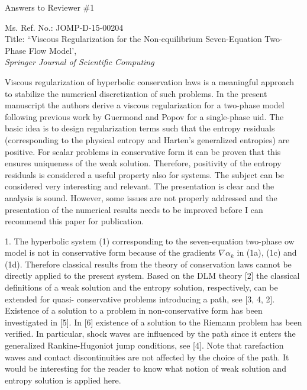 \documentclass{article}
\begin{document}

\begin{center}
{ \Large Answers to Reviewer \#1}
\end{center}

\bigskip

\noindent Ms. Ref. No.: JOMP-D-15-00204\\
Title: ``Viscous Regularization for the Non-equilibrium Seven-Equation Two-Phase Flow Model', \\
{\it Springer Journal of Scientific Computing}\\

\bigskip
\bigskip

{\color{blue}
Viscous regularization of hyperbolic conservation laws is a meaningful approach to stabilize
the numerical discretization of such problems. In the present manuscript the authors derive
a viscous regularization for a two-phase model following previous work by Guermond and
Popov for a single-phase 
uid. The basic idea is to design regularization terms such that
the entropy residuals (corresponding to the physical entropy and Harten's generalized
entropies) are positive. For scalar problems in conservative form it can be proven that this
ensures uniqueness of the weak solution. Therefore, positivity of the entropy residuals is
considered a useful property also for systems.
The subject can be considered very interesting and relevant. The presentation is clear
and the analysis is sound. However, some issues are not properly addressed and the
presentation of the numerical results needs to be improved before I can recommend this
paper for publication.}

\bigskip


{\color{blue}
1. The hyperbolic system (1) corresponding to the seven-equation two-phase ow model
is not in conservative form because of the gradients $\nabla \alpha_k$ in (1a), (1c) and (1d).
Therefore classical results from the theory of conservation laws cannot be directly
applied to the present system. Based on the DLM theory [2] the classical definitions
of a weak solution and the entropy solution, respectively, can be extended for quasi-
conservative problems introducing a path, see [3, 4, 2]. Existence of a solution to
a problem in non-conservative form has been investigated in [5]. In [6] existence of
a solution to the Riemann problem has been verified. In particular, shock waves
are influenced by the path since it enters the generalized Rankine-Hugoniot jump
conditions, see [4]. Note that rarefaction waves and contact discontinuities are not
affected by the choice of the path. It would be interesting for the reader to know
what notion of weak solution and entropy solution is applied here.}
\end{document}
